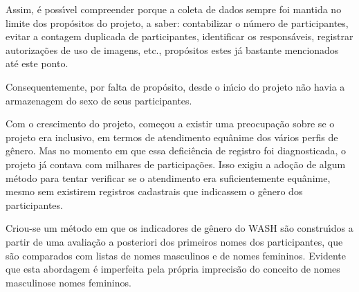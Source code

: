 \documentclass[
12pt,		%
openright,	%
twoside,  %
a4paper,			%
chapter=TITLE,		%
english,			%
french,				%
spanish,			%
brazil				%
]{USPSC-classe/USPSC}
\begin{document}
Assim, \'e poss\'{\i}vel compreender porque a coleta de dados sempre foi mantida no limite dos prop\'ositos do projeto, a saber: contabilizar o n\'umero de participantes, evitar a contagem duplicada de participantes, identificar os respons\'aveis, registrar autoriza\c{c}\~oes de uso de imagens, etc., prop\'ositos estes j\'a bastante mencionados at\'e este ponto.

















Consequentemente, por falta de prop\'osito, desde o in\'{\i}cio do projeto n\~ao havia a armazenagem do sexo de seus participantes.

















Com o crescimento do projeto, come\c{c}ou a existir uma preocupa\c{c}\~ao sobre se o projeto era inclusivo, em termos de atendimento equ\^anime dos v\'arios perfis de g\^enero. Mas no momento em que essa defici\^encia de registro foi diagnosticada, o projeto j\'a contava com milhares de participa\c{c}\~oes. Isso exigiu a ado\c{c}\~ao de algum m\'etodo para tentar verificar se o atendimento era suficientemente equ\^anime, mesmo sem existirem registros cadastrais que indicassem o g\^enero dos participantes.

















Criou-se um m\'etodo em que os indicadores de g\^enero do WASH s\~ao constru\'{\i}dos a partir de uma avalia\c{c}\~ao a posteriori dos primeiros nomes dos participantes, que s\~ao comparados com listas de nomes masculinos e de nomes femininos. Evidente que esta abordagem \'e imperfeita pela pr\'opria imprecis\~ao do conceito de \textquotedbl nomes masculinos\textquotedbl  e \textquotedbl nomes femininos\textquotedbl .
\end{document}
